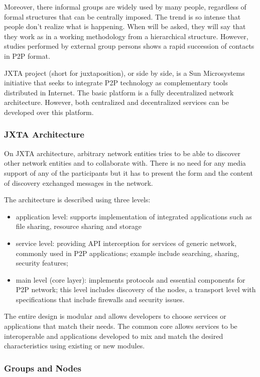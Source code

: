 Moreover, there informal groups are widely used by many people, regardless of
formal structures that can be centrally imposed. The trend is so intense that
people don't realize what is happening. When will be asked, they will say that
they work as in a working methodology from a hierarchical structure. However,
studies performed by external group persons shows a rapid succession of contacts
in P2P format.

JXTA project (short for juxtaposition), or side by side, is a Sun Microsystems
initiative that seeks to integrate P2P technology as complementary tools
distributed in Internet. The basic platform is a fully decentralized network
architecture. However, both centralized and decentralized services can be
developed over this platform.

\subsubsection{JXTA Architecture}

On JXTA architecture, arbitrary network entities tries to be able to discover
other network entities and to collaborate with. There is no need for any media
support of any of the participants but it has to present the form and the
content of discovery exchanged messages in the network.

The architecture is described using three levels:

\begin{itemize}
  \item application level: supports implementation of integrated applications
  such as file sharing, resource sharing and storage
  \item service level: providing API interception for services of generic
  network, commonly used in P2P applications; example include searching, sharing,
  security features;
  \item main level (core layer): implements protocols and essential components
  for P2P network; this level includes discovery of the nodes, a transport level
  with specifications that include firewalls and security issues.
\end{itemize}

The entire design is modular and allows developers to choose services or
applications that match their needs. The common core allows services to be
interoperable and applications developed to mix and match the desired
characteristics using existing or new modules.

\subsubsection{Groups and Nodes}

